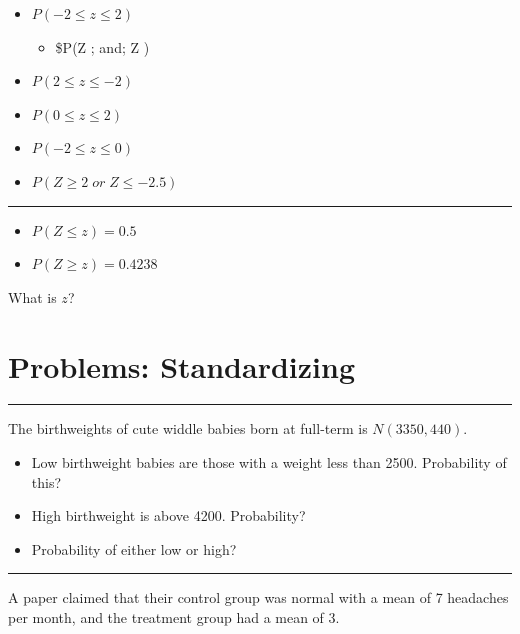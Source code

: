 \documentclass[
  letterpaper,
  DIV=11,
  numbers=noendperiod]{scrreprt}
\providecommand{\tightlist}{%
  \setlength{\itemsep}{0pt}\setlength{\parskip}{0pt}}\usepackage{longtable,booktabs,array}
\begin{document}
\begin{itemize}
\tightlist
\item
  \(P(-2 \le z \le 2)\)

  \begin{itemize}
  \tightlist
  \item
    \$P(Z ; and; Z )
  \end{itemize}
\item
  \(P(2 \le z \le -2)\)
\item
  \(P(0 \le z \le 2)\)
\item
  \(P(-2 \le z \le 0)\)
\item
  \(P(Z \ge 2\; or\; Z \le -2.5)\)
\end{itemize}

\begin{center}\rule{0.5\linewidth}{0.5pt}\end{center}

\begin{itemize}
\tightlist
\item
  \(P(Z \le z) = 0.5\)
\item
  \(P(Z \ge z) = 0.4238\)
\end{itemize}

What is \(z\)?

\hypertarget{problems-standardizing}{%
\chapter{Problems: Standardizing}\label{problems-standardizing}}

\begin{center}\rule{0.5\linewidth}{0.5pt}\end{center}

The birthweights of cute widdle babies born at full-term is
\(N(3350, 440)\).

\begin{itemize}
\tightlist
\item
  Low birthweight babies are those with a weight less than 2500.
  Probability of this?
\item
  High birthweight is above 4200. Probability?
\item
  Probability of either low or high?
\end{itemize}

\begin{center}\rule{0.5\linewidth}{0.5pt}\end{center}

A paper claimed that their control group was normal with a mean of 7
headaches per month, and the treatment group had a mean of 3.
\end{document}
